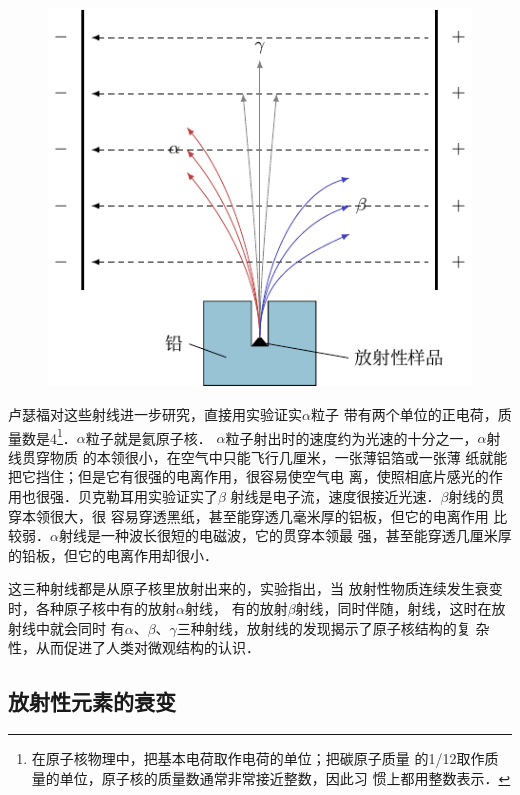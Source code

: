 \begin{figure}[htbp]
    \centering
    \includegraphics{fig/C/9-1.pdf}
    \caption{}\label{fig_C_9-1}
\end{figure}

卢瑟福对这些射线进一步研究，直接用实验证实$\alpha$粒子
带有两个单位的正电荷，质量数是4\footnote{在原子核物理中，把基本电荷取作电荷的单位；把碳原子质量
的1/12取作质量的单位，原子核的质量数通常非常接近整数，因此习
惯上都用整数表示．}．$\alpha$粒子就是氦原子核．
$\alpha$粒子射出时的速度约为光速的十分之一，$\alpha$射线贯穿物质
的本领很小，在空气中只能飞行几厘米，一张薄铝箔或一张薄
纸就能把它挡住；但是它有很强的电离作用，很容易使空气电
离，使照相底片感光的作用也很强．贝克勒耳用实验证实了$\beta$
射线是电子流，速度很接近光速．$\beta$射线的贯穿本领很大，很
容易穿透黑纸，甚至能穿透几毫米厚的铝板，但它的电离作用
比较弱．$\alpha$射线是一种波长很短的电磁波，它的贯穿本领最
强，甚至能穿透几厘米厚的铅板，但它的电离作用却很小．

这三种射线都是从原子核里放射出来的，实验指出，当
放射性物质连续发生衰变时，各种原子核中有的放射$\alpha$射线，
有的放射$\beta$射线，同时伴随，射线，这时在放射线中就会同时
有$\alpha$、$\beta$、$\gamma$三种射线，放射线的发现揭示了原子核结构的复
杂性，从而促进了人类对微观结构的认识．

\subsection{放射性元素的衰变}


